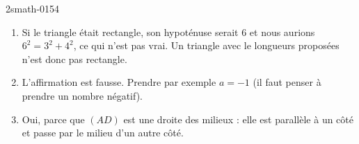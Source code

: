 
\begin{corrige}{2smath-0154}

    \begin{enumerate}
        \item
            Si le triangle était rectangle, son hypoténuse serait \( 6\) et nous aurions \( 6^2=3^2+4^2\), ce qui n'est pas vrai. Un triangle avec le longueurs proposées n'est donc pas rectangle.
        \item
            L'affirmation est fausse. Prendre par exemple \( a=-1\) (il faut penser à prendre un nombre négatif).
        \item
            Oui, parce que \( (AD)\) est une droite des milieux : elle est parallèle à un côté et passe par le milieu d'un autre côté.
    \end{enumerate}

\end{corrige}
